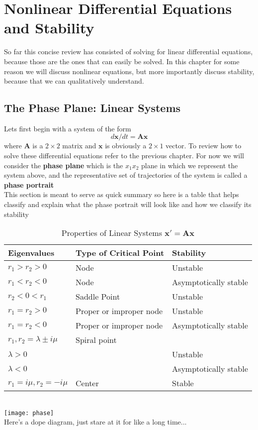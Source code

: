 \chapter{Nonlinear Differential Equations and Stability}
So far this concise review has consisted of solving for linear differential equations, because those are the ones that can easily be solved. In this chapter for some reason we will discuss nonlinear equations, but more importantly discuss stability, because that we can qualitatively understand. 
\section{The Phase Plane: Linear Systems}
Lets first begin with a system of the form 
\[ d \textbf{x}/dt = \textbf{Ax} \]
where $ \textbf{A} $ is a $ 2 \times 2 $ matrix and $ \textbf{x} $ is obviously a $ 2 \times 1 $ vector. To review how to solve these differential equations refer to the previous chapter. For now we will consider the \textbf{phase plane} which is the $ x_1x_2 $ plane in which we represent the system above, and the representative set of trajectories of the system is called a \textbf{phase portrait} 
\\ This section is meant to serve as quick summary so here is a table that helps classify and explain what the phase portrait will look like and how we classify its stability
\begin{table}[]
	\centering
	\caption{Properties of Linear Systems $ \textbf{x}' = \textbf{Ax} $}
	\label{that one table}
	\begin{tabular}{@{}lll@{}}
		\toprule
		Eigenvalues & Type of Critical Point & Stability \\ \midrule
		$ r_1 > r_2 > 0 $ & Node & Unstable \\
		$ r_1 < r_2 < 0 $ & Node &  Asymptotically stable\\
		$ r_2 < 0 < r_1 $ & Saddle Point & Unstable \\
		$ r_1 = r_2 > 0 $ & Proper or improper node & Unstable \\
		$ r_1 = r_2 < 0 $ & Proper or improper node & Asymptotically stable \\
		$ r_1, r_2 = \lambda \pm i \mu $ & Spiral point &  \\
		$\lambda > 0$ &  & Unstable \\
		$\lambda < 0$ &  & Asymptotically stable \\
		$ r_1 = i \mu, r_2 = -i\mu  $& Center & Stable \\ \bottomrule
	\end{tabular}
\end{table}
	\\
	\texttt{[image: phase]}
	\\
	Here's a dope diagram, just stare at it for like a long time...  \\
	